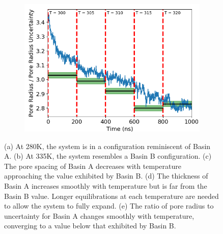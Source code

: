 \documentclass{article}
\begin{document}
\begin{figure}
\begin{subfigure}[b]{0.325\textwidth}
                \caption{}\label{fig:thickness_step}
        \end{subfigure}
        \begin{subfigure}[b]{0.325\textwidth}
                \centering
                \includegraphics[width=\textwidth]{order_layered.png}
                \caption{}\label{fig:order_step}
        \end{subfigure}
	\caption{(a) At 280K, the system is in a configuration reminiscent of
	Basin A. (b) At 335K, the system resembles a Basin B configuration. (c) The pore
	spacing of Basin A decreases with temperature approaching the value 
	exhibited by Basin B. (d) The thickness of Basin A increases smoothly with 
	temperature but is far from the Basin B value. Longer equilibrations at 
	each temperature are needed to allow the system to fully expand. (e) The ratio 
	of pore radius to uncertainty for Basin A changes smoothly with temperature,
	converging to a value below that exhibited by Basin B.}\label{fig:phase_transition}
  \end{figure}
\end{document}
